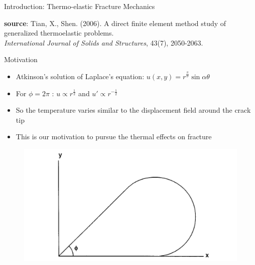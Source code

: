 \documentclass{beamer}
\begin{document}
\begin{frame}[t,fragile]{Introduction: Thermo-elastic Fracture Mechanics}
\begin{itemize}
\begin{figure}[H]
\begin{subfigure}{0.45\textwidth}
 \end{subfigure}
 \end{figure}
 \end{itemize}
 \vspace{.1cm}
   \tiny
   \hspace{15pt}
    \textbf{source}: Tian, X., Shen. (2006). A direct finite element method study of generalized thermoelastic problems. \\
   \vspace{-7pt}
   \hspace{15pt}
   \emph{International Journal of Solids and Structures}, 43(7), 2050-2063.
\end{frame}
\begin{frame}[t,fragile]{Motivation}
    \begin{itemize}
\item Atkinson's solution of Laplace's equation: $u(x,y)= r^{\frac{\pi}{\phi}}\sin\alpha\theta$\\
     \item For $\phi=2\pi$ :  $u \propto r^{\frac{1}{2}}$ and $u'\propto  r^{-\frac{1}{2}}$  
     \item So the temperature varies similar to the displacement field around the crack tip
     \item This is our motivation to pursue the thermal effects on fracture
     \end{itemize}
        \begin{figure}
    \centering
    \includegraphics[width=.5\textwidth]{pie.png}
\end{figure}


\end{frame}
\end{document}
